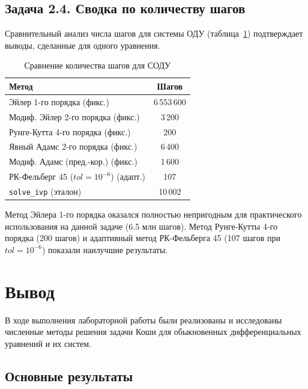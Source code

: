 \documentclass[a4paper]{article}
\begin{document}
\subsection*{Задача 2.4. Сводка по количеству шагов}

Сравнительный анализ числа шагов для системы ОДУ (таблица~\ref{tab:task2_steps}) подтверждает выводы, сделанные для одного уравнения.

\begin{table}[H]
\centering
\caption{Сравнение количества шагов для СОДУ}
\label{tab:task2_steps}
\begin{tabular}{|l|c|}
\hline
\textbf{Метод} & \textbf{Шагов} \\
\hline
Эйлер 1-го порядка (фикс.)              & 6\,553\,600 \\
Модиф. Эйлер 2-го порядка (фикс.)       & 3\,200 \\
Рунге-Кутта 4-го порядка (фикс.)        & 200 \\
Явный Адамс 2-го порядка (фикс.)        & 6\,400 \\
Модиф. Адамс (пред.-кор.) (фикс.)       & 1\,600 \\
РК-Фельберг 45 ($tol = 10^{-6}$) (адапт.) & 107 \\
\hline
\texttt{solve\_ivp} (эталон)             & 10\,002 \\
\hline
\end{tabular}
\end{table}

Метод Эйлера 1-го порядка оказался полностью непригодным для практического использования на данной задаче (6.5 млн шагов). Метод Рунге-Кутты 4-го порядка (200 шагов) и адаптивный метод РК-Фельберга 45 (107 шагов при $tol=10^{-6}$) показали наилучшие результаты.

\newpage

\section*{\centering\fontsize{14pt}{0pt}\selectfont\textbf{Вывод}\label{sec:conclusion}}

В ходе выполнения лабораторной работы были реализованы и исследованы численные методы решения задачи Коши для обыкновенных дифференциальных уравнений и их систем.

\subsection*{Основные результаты}
\end{document}
